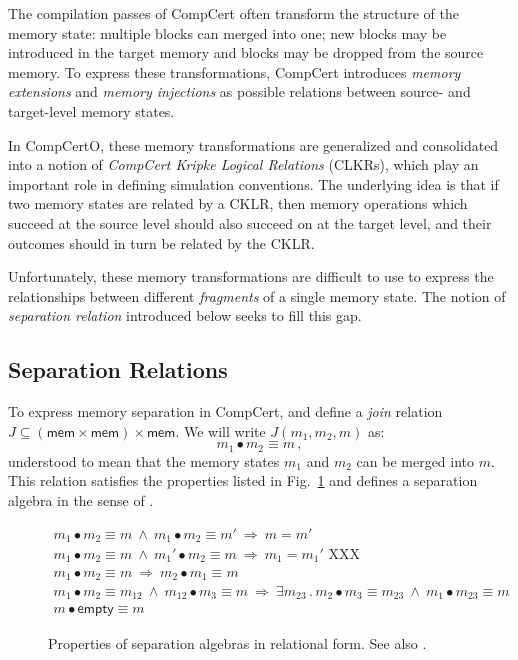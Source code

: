 \documentclass[acmsmall,screen,review,anonymous]{acmart}
\newcommand{\kw}[1]{\ensuremath{ \mathsf{#1} }}
\begin{document}
The compilation passes of CompCert
often transform the structure of the memory state:
multiple blocks can merged into one;
new blocks may be introduced in the target memory
and blocks may be dropped from the source memory.
To express these transformations,
CompCert introduces \emph{memory extensions} and \emph{memory injections}
as possible relations between source- and target-level memory states.

In CompCertO,
these memory transformations are generalized and consolidated
into a notion of \emph{CompCert Kripke Logical Relations} (CLKRs),
which play an important role in defining simulation conventions.
The underlying idea is that
if two memory states are related by a CKLR,
then memory operations which succeed at the source level
should also succeed on at the target level,
and their outcomes should in turn be related
by the CKLR.

Unfortunately,
these memory transformations are difficult to use
to express the relationships between
different \emph{fragments} of a single memory state.
The notion of \emph{separation relation} introduced below
seeks to fill this gap.

\subsection{Separation Relations} %

To express memory separation in CompCert,
and define a \emph{join} relation
$J \subseteq (\kw{mem} \times \kw{mem}) \times \kw{mem}$.
We will write $J(m_1, m_2, m)$ as:
\[
  m_1 \bullet m_2 \equiv m
  \,,
\]
understood to mean that
the memory states $m_1$ and $m_2$
can be merged into $m$.
This relation satisfies the properties listed in Fig.~\ref{fig:sepalg}
and defines a separation algebra in the sense of \citet{freshlook}.

\begin{figure}
  \begin{gather*}
    m_1 \bullet m_2 \equiv m \:\wedge\:
      m_1 \bullet m_2 \equiv m' \:\Rightarrow\:
      m = m'
      \\
    m_1 \bullet m_2 \equiv m \:\wedge\:
      m_1' \bullet m_2 \equiv m \:\Rightarrow\:
      m_1 = m_1'
      \text{ XXX}
      \\
    m_1 \bullet m_2 \equiv m \:\Rightarrow\:
      m_2 \bullet m_1 \equiv m
      \\
    m_1 \bullet m_2 \equiv m_{12} \:\wedge\:
      m_{12} \bullet m_3 \equiv m \:\Rightarrow\:
      \exists m_{23} \mathrel.
      m_2 \bullet m_3 \equiv m_{23} \:\wedge\:
      m_1 \bullet m_{23} \equiv m
      \\
    m \bullet \kw{empty} \equiv m
  \end{gather*}
  \caption{Properties of separation algebras
    in relational form. See also \citet{freshlook}.}
  \label{fig:sepalg}
\end{figure}
\end{document}
